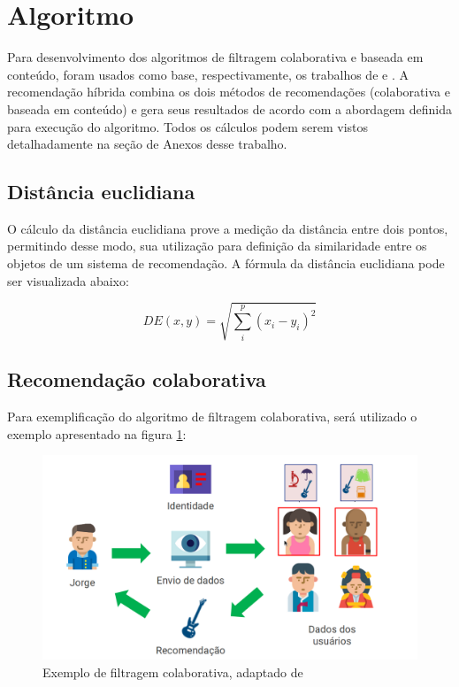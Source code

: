 \section{Algoritmo}

Para desenvolvimento dos algoritmos de filtragem colaborativa e baseada em conteúdo, foram usados como base, respectivamente, os trabalhos de  e . A recomendação híbrida combina os dois métodos de recomendações (colaborativa e baseada em conteúdo) e gera seus resultados de acordo com a abordagem definida para execução do algoritmo. Todos os cálculos podem serem vistos detalhadamente na seção de Anexos desse trabalho.

\subsection{Distância euclidiana}

O cálculo da distância euclidiana prove a medição da distância entre dois pontos, permitindo desse modo, sua utilização para definição da similaridade entre os objetos de um sistema de recomendação. A fórmula da distância euclidiana pode ser visualizada abaixo:

\begin{equation*}
    DE\left( x,y\right)   = \sqrt {\sum _{i}^{p}  \left( x_{i}-y_{i}\right)^2 }
    \label{eq:euclidiana}
\end{equation*}

\subsection{Recomendação colaborativa}

Para exemplificação do algoritmo de filtragem colaborativa, será utilizado o exemplo apresentado na figura \ref{fig:algoritmocolaborativo}:

\begin{figure}[H]
	\centering
	\includegraphics[width=0.7\linewidth]{imagens/colaborativa.png}
	\caption[Exemplo de filtragem colaborativa]{Exemplo de filtragem colaborativa, adaptado de \cite{araujo2011apprecommender}}
    \label{fig:algoritmocolaborativo}
\end{figure}

